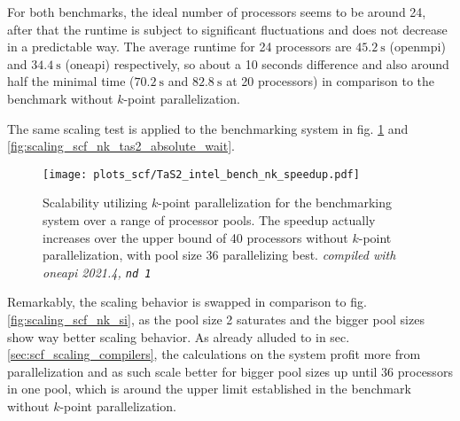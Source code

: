 \documentclass[main.tex]{subfiles}
\begin{document}
For both benchmarks, the ideal number of processors seems to be around 24, after that the runtime is subject to significant fluctuations and does not decrease in a predictable way.
The average runtime for 24 processors are \(\SI{45.2}{\second}\) (\gls{openmpi}) and \(\SI{34.4}{\second}\) (\gls{oneapi}) respectively, so about a 10 seconds difference and also around half the minimal time (\(\SI{70.2}{\second}\) and \(\SI{82.8}{\second}\) at 20 processors) in comparison to the benchmark without \(k\)-point parallelization.

The same scaling test is applied to the \TaS benchmarking system in fig. \ref{fig:scaling_scf_nk_tas2} and \ref{fig:scaling_scf_nk_tas2_absolute_wait}.

\begin{figure}[h!]
    \centering
    \texttt{[image: plots\_scf/TaS2\_intel\_bench\_nk\_speedup.pdf]}
    \caption{Scalability utilizing \(k\)-point parallelization for the \TaS benchmarking system over a range of processor pools. The speedup actually increases over the upper bound of 40 processors without \(k\)-point parallelization, with pool size 36 parallelizing best. \emph{\QE compiled with \gls{oneapi} 2021.4, \texttt{nd 1}}}
    \label{fig:scaling_scf_nk_tas2}
\end{figure}
Remarkably, the scaling behavior is swapped in comparison to fig. \ref{fig:scaling_scf_nk_si}, as the pool size 2 saturates and the bigger pool sizes show way better scaling behavior.
As already alluded to in sec. \ref{sec:scf_scaling_compilers}, the calculations on the \TaS system profit more from parallelization and as such scale better for bigger pool sizes up until 36 processors in one pool, which is around the upper limit established in the benchmark without \(k\)-point parallelization.
\end{document}
